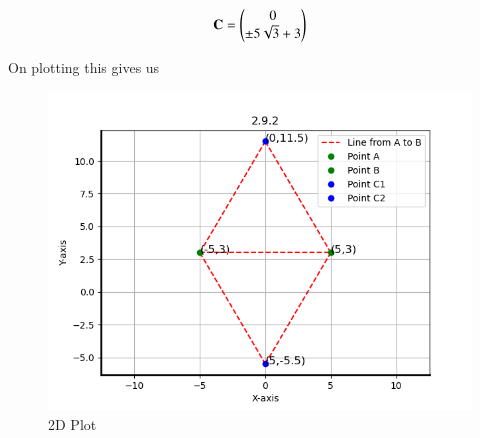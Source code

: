 \documentclass[journal]{IEEEtran}
\begin{document}
\begin{align}
    \textbf{C} = \begin{pmatrix}0\\\pm 5\sqrt{3}+3\end{pmatrix}
    \label{0.9}
\end{align}

On plotting this gives us

\begin{figure}[H]
    \centering
    \includegraphics[width=0.8\columnwidth]{figs/fig1.png}
    \caption{2D Plot}
    \label{3D Plot}
\end{figure}
\end{document}
